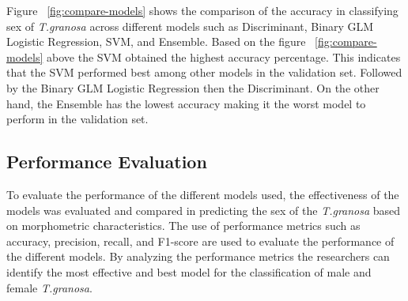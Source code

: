 Figure ~\ref{fig:compare-models} shows the comparison of the accuracy in classifying sex of \textit{T.granosa} across different models such as Discriminant, Binary GLM Logistic Regression, SVM, and Ensemble. Based on the figure ~\ref{fig:compare-models} above the SVM obtained the highest accuracy percentage. This indicates that the SVM performed best among other models in the validation set. Followed by the Binary GLM Logistic Regression then the Discriminant. On the other hand, the Ensemble has the lowest accuracy making it the worst model to perform in the validation set. 

\subsection{Performance Evaluation}

To evaluate the performance of the different models used, the effectiveness of the models was evaluated and compared in predicting the sex of the \textit{T.granosa} based on morphometric characteristics. The use of performance metrics such as accuracy, precision, recall, and F1-score are used to evaluate the performance of the different models. By analyzing the performance metrics the researchers can identify the most effective and best model for the classification of male and female \textit{T.granosa}. 


\begin{table}[H]
	\centering
	\caption{Model Performance Comparison}
	\label{tab:model-performance}
\end{table}

